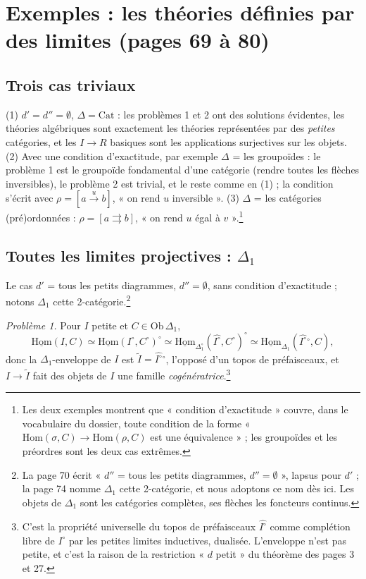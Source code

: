 \documentclass[11pt,a4paper]{article}
\begin{document}
\section*{Exemples : les théories définies par des limites (pages 69 à 80)}

\subsection*{Trois cas triviaux}

(1) $d' = d'' = \emptyset$, $\Delta = \mathrm{Cat}$ : les problèmes 1 et 2
ont des solutions évidentes, les théories algébriques sont exactement les
théories représentées par des \emph{petites} catégories, et les $I \to R$
basiques sont les applications surjectives sur les objets. (2) Avec une
condition d'exactitude, par exemple $\Delta$ = les groupoïdes : le
problème 1 est le groupoïde fondamental d'une catégorie (rendre toutes les
flèches inversibles), le problème 2 est trivial, et le reste comme en (1) ;
la condition s'écrit avec $\rho = [a \xrightarrow{u} b]$, « on rend $u$
inversible ». (3) $\Delta$ = les catégories (pré)ordonnées : $\rho = [a
\rightrightarrows b]$, « on rend $u$ égal à $v$ ».\footnote{Les deux
exemples montrent que « condition d'exactitude » couvre, dans le
vocabulaire du dossier, toute condition de la forme « $\mathrm{Hom}(\sigma,
C) \to \mathrm{Hom}(\rho, C)$ est une équivalence » ; les groupoïdes et les
préordres sont les deux cas extrêmes.}

\subsection*{Toutes les limites projectives : $\Delta_{1}$}

Le cas $d'$ = tous les petits diagrammes, $d'' = \emptyset$, sans condition
d'exactitude ; notons $\Delta_{1}$ cette 2-catégorie.\footnote{La page 70
écrit « $d''$ = tous les petits diagrammes, $d'' = \emptyset$ », lapsus
pour $d'$ ; la page 74 nomme $\Delta_{1}$ cette 2-catégorie, et nous
adoptons ce nom dès ici. Les objets de $\Delta_{1}$ sont les catégories
complètes, ses flèches les foncteurs continus.}

\emph{Problème 1.} Pour $I$ petite et $C \in \mathrm{Ob}\,\Delta_{1}$,
\[
\underline{\mathrm{Hom}}(I, C) \simeq \underline{\mathrm{Hom}}(I^{\circ},
C^{\circ})^{\circ} \simeq \underline{\mathrm{Hom}}_{\Delta_{1}^{\circ}}
(\widehat{I^{\circ}}, C^{\circ})^{\circ} \simeq \underline{\mathrm{Hom}}_{
\Delta_{1}}(\widehat{I^{\circ}}{}^{\circ}, C),
\]
donc la $\Delta_{1}$-enveloppe de $I$ est $\widetilde{I} =
\widehat{I^{\circ}}{}^{\circ}$, l'opposé d'un topos de préfaisceaux, et $I
\to \widetilde{I}$ fait des objets de $I$ une famille
\emph{cogénératrice}.\footnote{C'est la propriété universelle du topos de
préfaisceaux $\widehat{I^{\circ}}$ comme complétion libre de $I^{\circ}$ par
les petites limites inductives, dualisée. L'enveloppe n'est pas petite, et
c'est la raison de la restriction « $d$ petit » du théorème des pages 3
et 27.}
\end{document}
